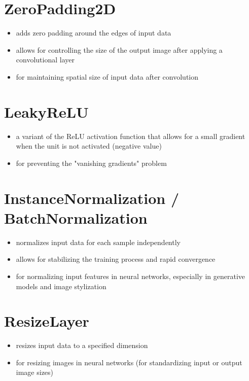 \documentclass{article}
\begin{document}
\section{ZeroPadding2D}
\begin{itemize}
    \item adds zero padding around the edges of input data
    \item allows for controlling the size of the output image after applying a convolutional layer
    \item for maintaining spatial size of input data after convolution
\end{itemize}

\section{LeakyReLU}
\begin{itemize}
    \item a variant of the ReLU activation function that allows for a small gradient when the unit is not activated (negative value)
    \item for preventing the "vanishing gradients" problem
\end{itemize}

\section{InstanceNormalization / BatchNormalization}
\begin{itemize}
    \item normalizes input data for each sample independently
    \item allows for stabilizing the training process and rapid convergence
    \item for normalizing input features in neural networks, especially in generative models and image stylization
\end{itemize}

\section{ResizeLayer}
\begin{itemize}
    \item resizes input data to a specified dimension
    \item for resizing images in neural networks (for standardizing input or output image sizes)
\end{itemize}
\end{document}
